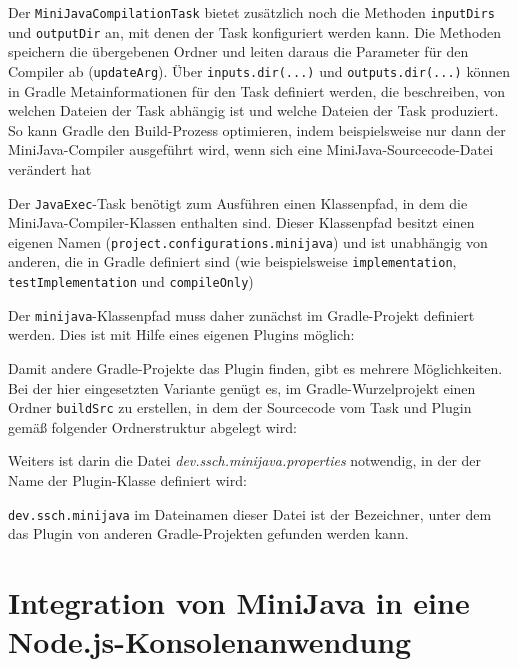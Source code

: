 

Der \lstinline{MiniJavaCompilationTask} bietet zusätzlich noch die Methoden \lstinline{inputDirs} und \lstinline{outputDir} an, mit denen der Task konfiguriert werden kann. Die Methoden speichern die übergebenen Ordner und leiten daraus die Parameter für den Compiler ab (\lstinline{updateArg}). Über \lstinline{inputs.dir(...)} und \lstinline{outputs.dir(...)} können in Gradle Metainformationen für den Task definiert werden, die beschreiben, von welchen Dateien der Task abhängig ist und welche Dateien der Task produziert. So kann Gradle den Build-Prozess optimieren, indem beispielsweise nur dann der MiniJava-Compiler ausgeführt wird, wenn sich eine MiniJava-Sourcecode-Datei verändert hat

Der \lstinline{JavaExec}-Task benötigt zum Ausführen einen Klassenpfad, in dem die MiniJava-Compiler-Klassen enthalten sind. Dieser Klassenpfad besitzt einen eigenen Namen (\lstinline{project.configurations.minijava}) und ist unabhängig von anderen, die in Gradle definiert sind (wie beispielsweise \lstinline{implementation}, \lstinline{testImplementation} und \lstinline{compileOnly})

Der \lstinline{minijava}-Klassenpfad muss daher zunächst im Gradle-Projekt definiert werden. Dies ist mit Hilfe eines eigenen Plugins möglich:



Damit andere Gradle-Projekte das Plugin finden, gibt es mehrere Möglichkeiten. Bei der hier eingesetzten Variante genügt es, im Gradle-Wurzelprojekt einen Ordner \lstinline{buildSrc} zu erstellen, in dem der Sourcecode vom Task und Plugin gemäß folgender Ordnerstruktur abgelegt wird:



Weiters ist darin die Datei \emph{dev.ssch.minijava.properties} notwendig, in der der Name der Plugin-Klasse definiert wird:



\lstinline{dev.ssch.minijava} im Dateinamen dieser Datei ist der Bezeichner, unter dem das Plugin von anderen Gradle-Projekten gefunden werden kann.

\section{Integration von MiniJava in eine Node.js-Konsolenanwendung}

